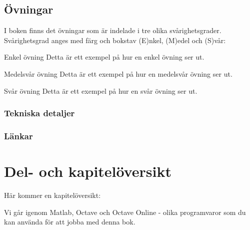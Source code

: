 \subsection{Övningar}
I boken finns det övningar som är indelade i tre olika svårighetsgrader. Svårighetsgrad anges med färg och bokstav (E)nkel, (M)edel och (S)vår:

\begin{matteovning}{Enkel övning}{}
Detta är ett exempel på hur en enkel övning ser ut.
\end{matteovning}

\begin{matteovningm}{Medelsvår övning}{}
Detta är ett exempel på hur en medelsvår övning ser ut.
\end{matteovningm}

\begin{matteovnings}{Svår övning}{}
Detta är ett exempel på hur en svår övning ser ut.
\end{matteovnings}

\subsubsection{Tekniska detaljer}

\subsubsection{Länkar}

\newpage
\section{Del- och kapitelöversikt}
Här kommer en kapitelöversikt:


\vspace{20pt}

\begin{addmargin}[1.7em]{1.7em}%


Vi går igenom Matlab, Octave och Octave Online - olika programvaror som du kan använda för att jobba med denna bok.

\end{addmargin}

